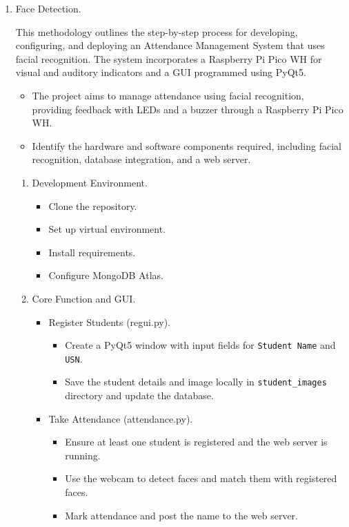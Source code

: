 \documentclass[12pt,a4paper]{report}
\begin{document}


\begin{enumerate}
	\item Face Detection.
		\par This methodology outlines the step-by-step process for developing, configuring, and deploying an Attendance Management System that uses facial recognition. The system incorporates a Raspberry Pi Pico WH for visual and auditory indicators and a GUI programmed using PyQt5.
		\begin{itemize}
			\item The project aims to manage attendance using facial recognition, providing feedback with LEDs and a buzzer through a Raspberry Pi Pico WH.
			\item Identify the hardware and software components required, including facial recognition, database integration, and a web server.
		\end{itemize}
		\begin{enumerate}
			\item Development Environment.
				\begin{itemize}
					\item Clone the repository.
					\item Set up virtual environment.
					\item Install requirements.
					\item Configure MongoDB Atlas.
				\end{itemize}
			\item Core Function and GUI.
				\begin{itemize}
					\item Register Students (regui.py).
						\begin{itemize}
							\item Create a PyQt5 window with input fields for \verb|Student Name| and \verb|USN|.
							\item Save the student details and image locally in \verb|student_images| directory and update the database.
						\end{itemize}
					\item Take Attendance (attendance.py).
						\begin{itemize}
							\item Ensure at least one student is registered and the web server is running.
							\item Use the webcam to detect faces and match them with registered faces.
							\item Mark attendance and post the name to the web server.

\end{itemize}
\end{itemize}
\end{enumerate}
\end{enumerate}
\end{document}
